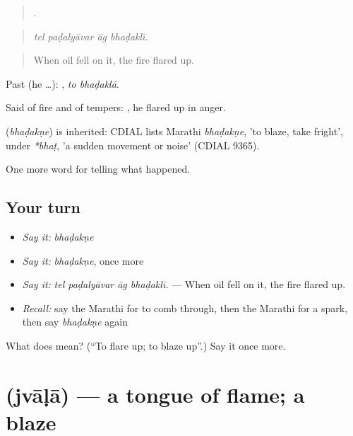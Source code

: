 \begin{quote}
   .
\end{quote}

\begin{quote}
\emph{tel paḍalyāvar āg bhaḍaklī.}
\end{quote}

\begin{quote}
When oil fell on it, the fire flared up.
\end{quote}

Past (he …):  , \emph{to bhaḍaklā}.

Said of fire and of tempers:  , he flared up in anger.

\begin{cousinweb}
\textbf{} (\emph{bhaḍakṇe}) is inherited: CDIAL lists Marathi \emph{bhaḍakṇe}, 'to blaze, take fright', under \emph{*bhaṭ}, 'a sudden movement or noise' (CDIAL 9365).
\end{cousinweb}

\begin{grammarlens}[title={What you've built}]
One more word for telling what happened.
\end{grammarlens}

\subsection*{Your turn}
\begin{itemize}
\raggedright
  \item \emph{Say it:} \emph{bhaḍakṇe}
  \item \emph{Say it:} \emph{bhaḍakṇe}, once more
  \item \emph{Say it:} \emph{tel paḍalyāvar āg bhaḍaklī.} — When oil fell on it, the fire flared up.
  \item \emph{Recall:} say the Marathi for to comb through, then the Marathi for a spark, then say \emph{bhaḍakṇe} again
\end{itemize}

\begin{tcolorbox}[breakable,colback=teal!4,colframe=teal!35!black,title={Before you move on}]
What does  mean? (\textquotedblleft{}To flare up; to blaze up\textquotedblright{}.) Say it once more.
\end{tcolorbox}
\section[\texorpdfstring{\mr{ज्वाळा} (jvāḷā)}{ज्वाळा (jvāḷā)}]{ (jvāḷā) — a tongue of flame; a blaze}

